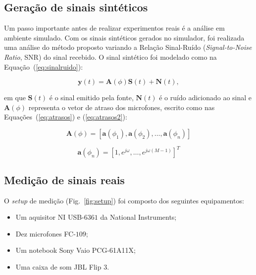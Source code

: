 \documentclass{sbrt2017port}
\begin{document}
\subsection{Geração de sinais sintéticos} 
Um passo importante antes de realizar experimentos reais é a análise em ambiente simulado. Com os sinais sintéticos gerados no simulador, foi realizada uma análise do método proposto variando a Relação Sinal-Ruído (\emph{Signal-to-Noise Ratio}, SNR) do sinal recebido. O sinal sintético foi modelado como na Equação~(\ref{eq:sinalruido}):

\begin{equation}\label{eq:sinalruido}
\mathbold{y}(t) = \mathbold{A}(\phi) \mathbold{S}(t) + \mathbold{N}(t),
\end{equation}

\noindent em que $\mathbold{S}(t)$ é o sinal emitido pela fonte, $\mathbold{N}(t)$ é o ruído adicionado ao sinal e $\mathbold{A}(\phi)$ representa o vetor de atraso dos microfones, escrito como nas Equações~(\ref{eq:atrasos}) e (\ref{eq:atrasos2}):

\begin{equation}\label{eq:atrasos}
\mathbold{A}(\phi) = [\mathbold{a}(\phi_1), \mathbold{a}(\phi_2), \dots , \mathbold{a}(\phi_n)]
\end{equation}

\begin{equation}
\label{eq:atrasos2}
\mathbold{a}(\phi_n) = [1, e^{j \omega }, \dots , e^{j \omega (M-1)}]^T
\end{equation}


\subsection{Medição de sinais reais}
O \textit{setup} de medição (Fig.~\ref{fig:setup}) foi composto dos seguintes equipamentos:
\begin{itemize}
	\item Um aquisitor NI USB-$6361$ da National Instruments;
	\item Dez microfones FC-$109$;
	\item Um notebook Sony Vaio PCG-61A11X;
	\item Uma caixa de som JBL Flip $3$.
\end{itemize}
\end{document}
